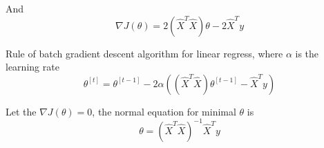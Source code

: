 \begin{answer}
And 
\begin{equation*}
    \nabla J(\theta) = 2(\hat{X}^T\hat{X})\theta - 2 \hat{X}^Ty 
\end{equation*}

Rule of batch gradient descent algorithm for linear regress, where $\alpha$ is the learning rate
\begin{equation*}
	\theta^{[t]} = \theta^{[t-1]} - 2\alpha \left((\hat{X}^T\hat{X})\theta^{[t-1]} -  \hat{X}^Ty\right)
\end{equation*}

Let the $\nabla J(\theta) = 0$, the normal equation for minimal $\theta$ is 
\begin{equation*}
	\theta = (\hat{X}^T\hat{X})^{-1} \hat{X}^Ty
\end{equation*}

\end{answer}
